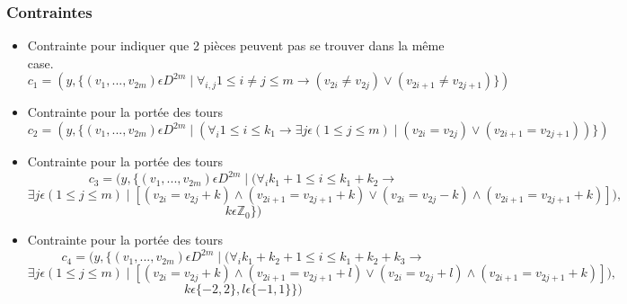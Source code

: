 \documentclass[a4paper,11pt]{article}
\begin{document}
\subsubsection{Contraintes}
\begin{itemize}
\item Contrainte pour indiquer que 2 pièces peuvent pas se trouver dans la même case.
   $$c_{1} = ( y, \{ (v_{1}, ..., v_{2m}) \epsilon  D^{2m} \mid \forall_{i,j} 1\leq i \neq j \leq m \rightarrow (v_{2i} \neq v_{2j}) \vee  (v_{2i+1} \neq v_{2j+1}) \} )$$ 

  
 \item Contrainte pour la portée des tours
   $$ c_{2} = ( y, \{ (v_{1}, ..., v_{2m}) \epsilon  D^{2m} \mid (\forall_{i} 1\leq i \leq k_{1} \rightarrow \exists j \epsilon (1 \leq j \leq m) \mid (v_{2i} = v_{2j}) \vee  (v_{2i+1} = v_{2j+1}) )\} ) $$

 \item Contrainte pour la portée des tours
   $$ c_{3} = ( y, \{ (v_{1}, ..., v_{2m}) \epsilon  D^{2m} \mid (\forall_{i} k_{1}+1\leq i \leq k_{1}+k_{2} \rightarrow$$
   $$\exists j \epsilon (1 \leq j \leq m) \mid [ (v_{2i} = v_{2j}+k) \wedge  (v_{2i+1} = v_{2j+1}+k) \vee  (v_{2i} = v_{2j}-k) \wedge  (v_{2i+1} = v_{2j+1}+k) ]),$$
   $$k \epsilon \mathbb{Z}_{0} \} ) $$

 \item Contrainte pour la portée des tours
   $$ c_{4} = ( y, \{ (v_{1}, ..., v_{2m}) \epsilon  D^{2m} \mid (\forall_{i} k_{1}+k_{2}+1\leq i \leq k_{1}+k_{2}+k_{3} \rightarrow$$
   $$\exists j \epsilon (1 \leq j \leq m) \mid [ (v_{2i} = v_{2j}+k) \wedge  (v_{2i+1} = v_{2j+1}+l) \vee  (v_{2i} = v_{2j}+l) \wedge  (v_{2i+1} = v_{2j+1}+k) ]),$$
   $$k \epsilon \{-2, 2\}, l \epsilon \{-1, 1\} \} ) $$

\end{itemize}
\end{document}
